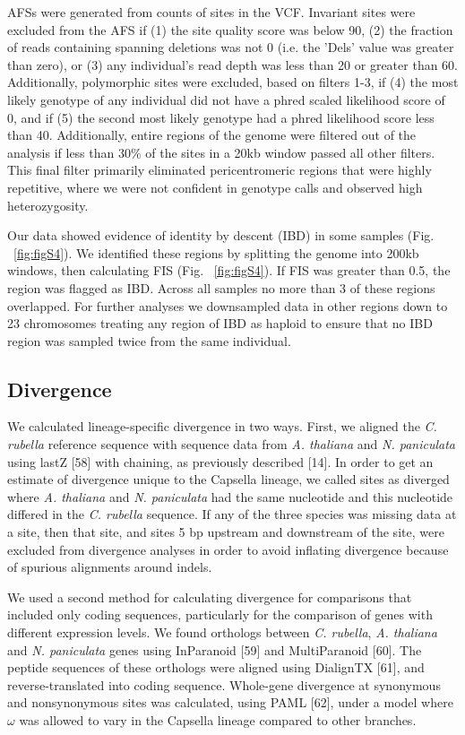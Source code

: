 AFSs were generated from counts of sites in the VCF. Invariant sites were excluded from the AFS if (1) the site quality score was below 90, (2) the fraction of reads containing spanning deletions was not 0 (i.e. the 'Dels' value was greater than zero), or (3) any individual's read depth was less than 20 or greater than 60. Additionally, polymorphic sites were excluded, based on filters 1-3, if (4) the most likely genotype of any individual did not have a phred scaled likelihood score of 0, and if (5) the second most likely genotype had a phred likelihood score less than 40. Additionally, entire regions of the genome were filtered out of the analysis if less than 30\% of the sites in a 20kb window passed all other filters. This final filter primarily eliminated pericentromeric regions that were highly repetitive, where we were not confident in genotype calls and observed high heterozygosity.

Our data showed evidence of identity by descent (IBD) in some samples (Fig. ~\ref{fig:figS4}). We identified these regions by splitting the genome into 200kb windows, then calculating FIS (Fig. ~\ref{fig:figS4}). If FIS was greater than 0.5, the region was flagged as IBD. Across all samples no more than 3 of these regions overlapped. For further analyses we downsampled data in other regions down to 23 chromosomes treating any region of IBD as haploid to ensure that no IBD region was sampled twice from the same individual.

\subsection{Divergence}

We calculated lineage-specific divergence in two ways. First, we aligned the \textit{C. rubella} reference sequence with sequence data from \textit{A. thaliana} and \textit{N. paniculata} using lastZ [58] with chaining, as previously described [14]. In order to get an estimate of divergence unique to the Capsella lineage, we called sites as diverged where \textit{A. thaliana} and \textit{N. paniculata} had the same nucleotide and this nucleotide differed in the \textit{C. rubella} sequence. If any of the three species was missing data at a site, then that site, and sites 5 bp upstream and downstream of the site, were excluded from divergence analyses in order to avoid inflating divergence because of spurious alignments around indels.

We used a second method for calculating divergence for comparisons that included only coding sequences, particularly for the comparison of genes with different expression levels. We found orthologs between \textit{C. rubella}, \textit{A. thaliana} and \textit{N. paniculata} genes using InParanoid [59] and MultiParanoid [60]. The peptide sequences of these orthologs were aligned using DialignTX [61], and reverse-translated into coding sequence. Whole-gene divergence at synonymous and nonsynonymous sites was calculated, using PAML [62], under a model where $\omega$ was allowed to vary in the Capsella lineage compared to other branches.

